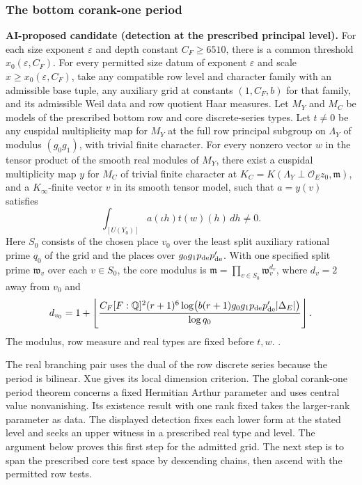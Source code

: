 %
\subsubsection{The bottom corank-one period}
\textbf{AI-proposed candidate (detection at the prescribed principal level).}
For each size exponent \(\varepsilon\) and depth constant
\(C_F\ge6510\), there is a common threshold \(x_0(\varepsilon,C_F)\).
For every permitted size datum of exponent \(\varepsilon\) and
scale \(x\ge x_0(\varepsilon,C_F)\), take any compatible row level
and character family with an admissible base tuple, any auxiliary
grid at constants \((1,C_F,b)\) for that family, and its admissible
Weil data and row quotient Haar measures. Let \(M_Y\) and \(M_C\)
be models of the prescribed bottom row and core discrete-series
types. Let \(t\ne0\) be any cuspidal multiplicity map for \(M_Y\)
at the full row principal subgroup on \(\Lambda_Y\) of modulus
\((g_0g_1)\), with trivial finite character. For every nonzero
vector \(w\) in the tensor product of the smooth real modules of
\(M_Y\), there exist a cuspidal multiplicity map \(y\) for \(M_C\)
of trivial finite character at
\(K_C=K(\Lambda_Y\perp\mathcal O_E z_0,\mathfrak m)\), and a
\(K_\infty\)-finite vector \(v\) in its smooth tensor model, such
that \(a=y(v)\) satisfies
\begin{equation}
 \label{eq:principal-core-detection}
 \int_{[U(Y_0)]} a(\iota h)t(w)(h)\,dh\ne0 .
\end{equation}
Here \(S_0\) consists of the chosen place \(v_0\) over the least
split auxiliary rational prime \(q_0\) of the grid and the places
over \(g_0g_1p_{\rm de}p'_{\rm de}\). With one specified split
prime \(\mathfrak w_v\) over each \(v\in S_0\), the core modulus
is \(\mathfrak m=\prod_{v\in S_0}\mathfrak w_v^{d_v}\),
where \(d_v=2\) away from \(v_0\) and
\[
 d_{v_0}=1+
 \left\lfloor
 \frac{C_F[F:\mathbb Q]^2(r+1)^6
    \log\bigl(b(r+1)g_0g_1p_{\rm de}p'_{\rm de}|\Delta_E|\bigr)}
      {\log q_0}
 \right\rfloor .
\]
The modulus, row measure and real types are fixed before \(t,w\).
.

The real branching pair uses the dual of the row discrete series
because the period is bilinear. Xue gives its local dimension
criterion. \cite[Theorem~1.1]{p2xue-bessel}
The global corank-one period theorem concerns a fixed Hermitian
Arthur parameter and uses central value nonvanishing. Its existence
result with one rank fixed takes the larger-rank parameter as data.
The displayed detection fixes each lower form at the stated level
and seeks an upper witness in a prescribed real type and level.
\cite[Theorems~1.1.5.1 and~1.1.5.3]{depth-endoscopic-ggp}
The argument below proves this first step for the admitted grid.
The next step is to span the prescribed core test space by
descending chains, then ascend with the permitted row tests.

